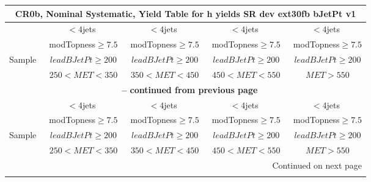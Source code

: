 \documentclass{article}
\begin{document}
\begin{longtable}{|l|c|c|c|c|} 
 
\multicolumn{5}{c}{ CR0b, Nominal Systematic, Yield Table for h yields SR dev ext30fb bJetPt v1 }\\* \hline 
  & $<4$jets  & $<4$jets  & $<4$jets  & $<4$jets \\* 
  & ~modTopness$\ge7.5$  & ~modTopness$\ge7.5$  & ~modTopness$\ge7.5$  & ~modTopness$\ge7.5$ \\* 
Sample  & ~$leadBJetPt\ge200$  & ~$leadBJetPt\ge200$  & ~$leadBJetPt\ge200$  & ~$leadBJetPt\ge200$ \\* 
  & ~$250<MET<350$  & ~$350<MET<450$  & ~$450<MET<550$  & ~$MET>550$ \\* 
\hline \hline 
\endfirsthead 
 
\multicolumn{5}{c}{{\bfseries \tablename\ \thetable{} -- continued from previous page}}\\* \hline 
  & $<4$jets  & $<4$jets  & $<4$jets  & $<4$jets \\* 
  & ~modTopness$\ge7.5$  & ~modTopness$\ge7.5$  & ~modTopness$\ge7.5$  & ~modTopness$\ge7.5$ \\* 
Sample  & ~$leadBJetPt\ge200$  & ~$leadBJetPt\ge200$  & ~$leadBJetPt\ge200$  & ~$leadBJetPt\ge200$ \\* 
  & ~$250<MET<350$  & ~$350<MET<450$  & ~$450<MET<550$  & ~$MET>550$ \\* 
\hline \hline 
\endhead 
 
\multicolumn{5}{|r|}{{Continued on next page}}\\* \hline 
\endfoot 
 
 
\endlastfoot 
 

\end{longtable}
\end{document}
